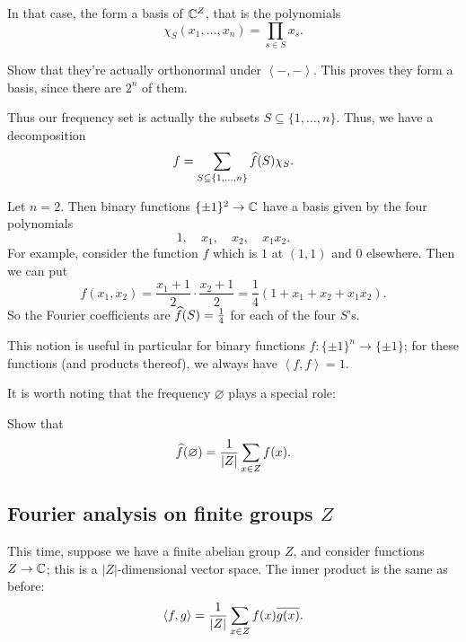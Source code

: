 In that case, the  form a basis of $\mathbb C^Z$,
that is the polynomials
\[ \chi_S(x_1, \dots, x_n) = \prod_{s \in S} x_s. \]
\begin{exercise}
	Show that they're actually orthonormal under $\left< -,-\right>$.
	This proves they form a basis, since there are $2^n$ of them.
\end{exercise}
Thus our frequency set is actually the subsets $S \subseteq \{1, \dots, n\}$.
Thus, we have a decomposition
\[ f = \sum_{S \subseteq \{1, \dots, n\}} \widehat f(S) \chi_S. \]
\begin{example}
	Let $n = 2$.
	Then binary functions $\{ \pm 1\}^2 \to \mathbb C$ have a basis
	given by the four polynomials
	\[ 1, \quad x_1, \quad x_2, \quad x_1x_2. \]
	For example, consider the function $f$
	which is $1$ at $(1,1)$ and $0$ elsewhere.
	Then we can put
	\[ f(x_1, x_2) = \frac{x_1+1}{2} \cdot \frac{x_2+1}{2}
		= \frac14 \left( 1 + x_1 + x_2 + x_1x_2 \right). \]
	So the Fourier coefficients are $\widehat f(S) = \frac 14$
	for each of the four $S$'s.
\end{example}
This notion is useful in particular for
binary functions $f : \{\pm1\}^n \to \{\pm1\}$;
for these functions (and products thereof),
we always have $\left< f,f \right> = 1$.

It is worth noting that the frequency $\varnothing$ plays a special role:
\begin{exercise}
	Show that
	\[ \widehat f(\varnothing) = \frac{1}{|Z|} \sum_{x \in Z} f(x). \]
\end{exercise}

\subsection{Fourier analysis on finite groups $Z$}
This time, suppose we have a finite abelian group $Z$,
and consider functions $Z \to \mathbb C$;
this is a $|Z|$-dimensional vector space.
The inner product is the same as before:
\[ \left< f,g \right> = \frac{1}{|Z|} \sum_{x \in Z} f(x) \overline{g(x)}. \]


